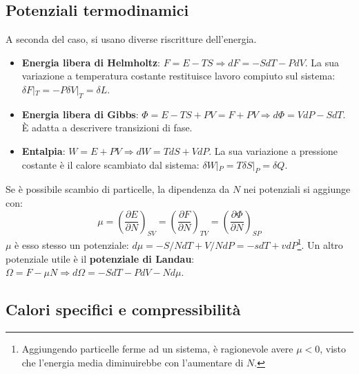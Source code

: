 \documentclass[10pt, a4paper]{scrartcl}
\numberwithin{equation}{subsection}
\theoremstyle{style1}
\begin{document}
\subsection{Potenziali termodinamici}
A seconda del caso, si usano diverse riscritture dell'energia.
\begin{itemize}
	\item \textbf{Energia libera di Helmholtz}: $F = E - TS \Rightarrow dF = -SdT - PdV$. La sua variazione a temperatura costante restituisce lavoro compiuto sul sistema: $\delta F |_T = - P \delta V |_T = \delta L$.
	\item \textbf{Energia libera di Gibbs}: $\Phi = E - TS + PV = F + PV \Rightarrow d\Phi=  VdP - SdT$. \`E adatta a descrivere transizioni di fase.
	\item \textbf{Entalpia}: $W = E + PV \Rightarrow dW=  TdS + VdP$. La sua variazione a pressione costante \`e il calore scambiato dal sistema: $\delta W|_P = T \delta S|_P = \delta Q$.
\end{itemize}
Se \`e possibile scambio di particelle, la dipendenza da $N$ nei potenziali si aggiunge con:
\begin{equation}
	\mu = \left(\frac{\partial E}{\partial N} \right) _{SV} = \left(\frac{\partial F}{\partial N} \right) _{TV} = \left(\frac{\partial \Phi}{\partial N} \right) _{SP} 
\end{equation}
$\mu $ \`e esso stesso un potenziale: $d\mu = - S / N dT + V / N dP = - s dT + vdP$\footnote{Aggiungendo particelle ferme ad un sistema, \`e ragionevole avere $\mu < 0$, visto che l'energia media diminuirebbe con l'aumentare di $N$.}. Un altro potenziale utile \`e il \textbf{potenziale di Landau}: $\Omega = F - \mu N\Rightarrow d\Omega = -SdT - PdV - N d\mu $.



\subsection{Calori specifici e compressibilit\`a}
\end{document}
